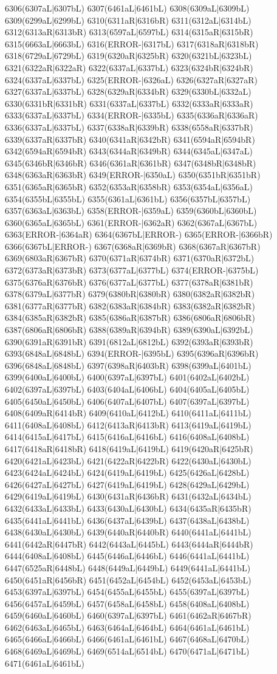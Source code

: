 6306(6307aL|6307bL) 6307(6461aL|6461bL) 6308(6309aL|6309bL) 6309(6299aL|6299bL) 6310(6311aR|6316bR) 6311(6312aL|6314bL) 6312(6313aR|6313bR) 6313(6597aL|6597bL) 6314(6315aR|6315bR) 6315(6663aL|6663bL) 6316(ERROR-|6317bL) 6317(6318aR|6318bR) 6318(6729aL|6729bL) 6319(6320aR|6325bR) 6320(6321bL|6323bL) 6321(6322aR|6322aR) 6322(6337aL|6337bL) 6323(6324bR|6324bR) 6324(6337aL|6337bL) 6325(ERROR-|6326aL) 6326(6327aR|6327aR) 6327(6337aL|6337bL) 6328(6329aR|6334bR) 6329(6330bL|6332aL) 6330(6331bR|6331bR) 6331(6337aL|6337bL) 6332(6333aR|6333aR) 6333(6337aL|6337bL) 6334(ERROR-|6335bL) 6335(6336aR|6336aR) 6336(6337aL|6337bL) 6337(6338aR|6339bR) 6338(6558aR|6337bR) 6339(6337aR|6337bR) 6340(6341aR|6342bR) 6341(6594aR|6594bR) 6342(6594aR|6594bR) 6343(6344aR|6349bR) 6344(6345aL|6347aL) 6345(6346bR|6346bR) 6346(6361aR|6361bR) 6347(6348bR|6348bR) 6348(6363aR|6363bR) 6349(ERROR-|6350aL) 6350(6351bR|6351bR) 6351(6365aR|6365bR) 6352(6353aR|6358bR) 6353(6354aL|6356aL) 6354(6355bL|6355bL) 6355(6361aL|6361bL) 6356(6357bL|6357bL) 6357(6363aL|6363bL) 6358(ERROR-|6359aL) 6359(6360bL|6360bL) 6360(6365aL|6365bL) 6361(ERROR-|6362aR) 6362(6367aL|6367bL) 6363(ERROR-|6364aR) 6364(6367bL|ERROR-) 6365(ERROR-|6366bR) 6366(6367bL|ERROR-) 6367(6368aR|6369bR) 6368(6367aR|6367bR) 6369(6803aR|6367bR) 6370(6371aR|6374bR) 6371(6370aR|6372bL) 6372(6373aR|6373bR) 6373(6377aL|6377bL) 6374(ERROR-|6375bL) 6375(6376aR|6376bR) 6376(6377aL|6377bL) 6377(6378aR|6381bR) 6378(6379aL|6377bR) 6379(6380bR|6380bR) 6380(6382aR|6382bR) 6381(6377aR|6377bR) 6382(6383aR|6384bR) 6383(6382aR|6382bR) 6384(6385aR|6382bR) 6385(6386aR|6387bR) 6386(6806aR|6806bR) 6387(6806aR|6806bR) 6388(6389aR|6394bR) 6389(6390aL|6392bL) 6390(6391aR|6391bR) 6391(6812aL|6812bL) 6392(6393aR|6393bR) 6393(6848aL|6848bL) 6394(ERROR-|6395bL) 6395(6396aR|6396bR) 6396(6848aL|6848bL) 6397(6398aR|6403bR) 6398(6399aL|6401bL) 6399(6400aL|6400bL) 6400(6397aL|6397bL) 6401(6402aL|6402bL) 6402(6397aL|6397bL) 6403(6404aL|6406bL) 6404(6405aL|6405bL) 6405(6450aL|6450bL) 6406(6407aL|6407bL) 6407(6397aL|6397bL) 6408(6409aR|6414bR) 6409(6410aL|6412bL) 6410(6411aL|6411bL) 6411(6408aL|6408bL) 6412(6413aR|6413bR) 6413(6419aL|6419bL) 6414(6415aL|6417bL) 6415(6416aL|6416bL) 6416(6408aL|6408bL) 6417(6418aR|6418bR) 6418(6419aL|6419bL) 6419(6420aR|6425bR) 6420(6421aL|6423bL) 6421(6422aR|6422bR) 6422(6430aL|6430bL) 6423(6424aL|6424bL) 6424(6419aL|6419bL) 6425(6426aL|6428bL) 6426(6427aL|6427bL) 6427(6419aL|6419bL) 6428(6429aL|6429bL) 6429(6419aL|6419bL) 6430(6431aR|6436bR) 6431(6432aL|6434bL) 6432(6433aL|6433bL) 6433(6430aL|6430bL) 6434(6435aR|6435bR) 6435(6441aL|6441bL) 6436(6437aL|6439bL) 6437(6438aL|6438bL) 6438(6430aL|6430bL) 6439(6440aR|6440bR) 6440(6441aL|6441bL) 6441(6442aR|6447bR) 6442(6443aL|6445bL) 6443(6444aR|6444bR) 6444(6408aL|6408bL) 6445(6446aL|6446bL) 6446(6441aL|6441bL) 6447(6525aR|6448bL) 6448(6449aL|6449bL) 6449(6441aL|6441bL) 6450(6451aR|6456bR) 6451(6452aL|6454bL) 6452(6453aL|6453bL) 6453(6397aL|6397bL) 6454(6455aL|6455bL) 6455(6397aL|6397bL) 6456(6457aL|6459bL) 6457(6458aL|6458bL) 6458(6408aL|6408bL) 6459(6460aL|6460bL) 6460(6397aL|6397bL) 6461(6462aR|6467bR) 6462(6463aL|6465bL) 6463(6464aL|6464bL) 6464(6461aL|6461bL) 6465(6466aL|6466bL) 6466(6461aL|6461bL) 6467(6468aL|6470bL) 6468(6469aL|6469bL) 6469(6514aL|6514bL) 6470(6471aL|6471bL) 6471(6461aL|6461bL) 